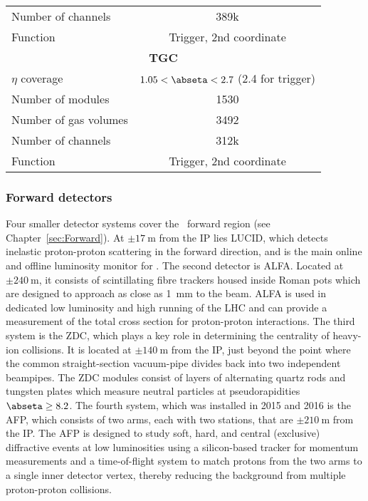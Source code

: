 \documentclass[cernpreprint, atlasdraft=false, UKenglish,british,orcidlogo, texmf, orcidlogo]{atlasdoc}
\begin{document}
\begin{table}[t]
\begin{center}
\begin{tabular}{|l|c|}
Number of channels       &
389k\\
Function                 & Trigger, 2nd coordinate \\ \hline
\multicolumn{2}{|c|}{\textbf{\gls{TGC}}}                \\ \hline
$\eta$ coverage                 & $1.05<\abseta<2.7$ (2.4 for trigger)\\
Number of modules       & \num{1530}              \\
Number of gas volumes       & \num{3492}              \\
Number of channels       &
312k \\
Function                 & Trigger, 2nd coordinate  \\ \hline
\end{tabular}
\end{center}
\end{table}
 
 
\subsubsection{Forward detectors}
Four smaller detector systems cover the \ATLAS\
forward region (see Chapter~\ref{sec:Forward}).
At $\pm\SI{17}{\m}$ from the \gls{IP} lies \gls{LUCID}, which detects inelastic proton-proton scattering in the forward direction, and is the main online and offline luminosity monitor for \ATLAS. The second detector is \gls{ALFA}. Located at
$\pm\SI{240}{\m}$, it consists of scintillating fibre trackers housed inside Roman pots which are designed to approach as
close as \SI{1}{\mm} to the beam. \gls{ALFA} is used in dedicated low luminosity and high \betastar running of the \gls{LHC} and can provide a measurement of the total cross section for proton-proton interactions.
The third system is the \gls{ZDC}, which plays
a key role in determining the centrality of heavy-ion collisions. It is located at
$\pm\SI{140}{\m}$ from the \gls{IP}, just beyond the point  where the common straight-section
vacuum-pipe divides back into two independent beampipes. The \gls{ZDC} modules consist of layers of alternating quartz
rods and tungsten plates which measure neutral particles at pseudorapidities $\abseta \ge 8.2$.
The fourth system, which was installed in 2015 and 2016 is the \gls{AFP}, which consists of two arms, each with two stations, that are $\pm\SI{210}{\m}$ from the \gls{IP}. The \gls{AFP} is designed to study soft, hard, and central (exclusive) diffractive events at low luminosities using a silicon-based tracker for momentum measurements and a time-of-flight system to match protons from the two arms to a single inner detector vertex, thereby reducing the background from multiple proton-proton collisions.
 
\end{document}
